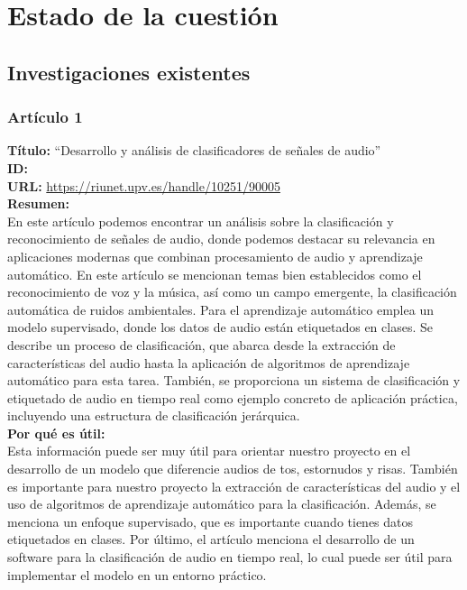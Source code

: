 \section{Estado de la cuestión}
\subsection{Investigaciones existentes}
\subsubsection*{Artículo 1}
\begin{flushleft}
    \textbf{Título:}
    “Desarrollo y análisis de clasificadores de señales de audio”
    \\
    \textbf{ID: \cite{aguirre2017desarrollo}}
    \\
    \textbf{URL:}
    \url{https://riunet.upv.es/handle/10251/90005}
    \\
    \textbf{Resumen:\\}
    En este artículo podemos encontrar un análisis sobre la clasificación y reconocimiento de señales de audio, donde podemos destacar su relevancia en aplicaciones modernas que combinan procesamiento de audio y aprendizaje automático. En este artículo se mencionan temas bien establecidos como el reconocimiento de voz y la música, así como un campo emergente, la clasificación automática de ruidos ambientales. Para el aprendizaje automático emplea un modelo supervisado, donde los datos de audio están etiquetados en clases. Se describe un proceso de clasificación, que abarca desde la extracción de características del audio hasta la aplicación de algoritmos de aprendizaje automático para esta tarea. También, se proporciona un sistema de clasificación y etiquetado de audio en tiempo real como ejemplo concreto de aplicación práctica, incluyendo una estructura de clasificación jerárquica.
    \\
    \textbf{Por qué es útil:\\}
    Esta información puede ser muy útil para orientar nuestro proyecto en el desarrollo de un modelo que diferencie audios de tos, estornudos y risas. También es importante para nuestro proyecto la extracción de características del audio y el uso de algoritmos de aprendizaje automático para la clasificación. Además, se menciona un enfoque supervisado, que es importante cuando tienes datos etiquetados en clases. Por último, el artículo menciona el desarrollo de un software para la clasificación de audio en tiempo real, lo cual puede ser útil para implementar el modelo en un entorno práctico.
\end{flushleft}
